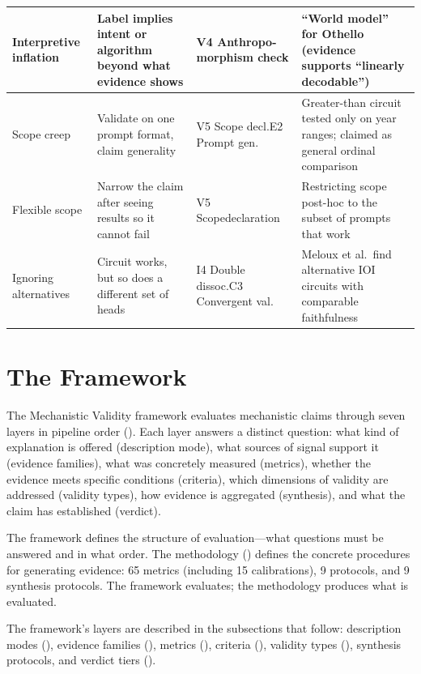 \documentclass{article}
\begin{document}
\begin{table}[H]
\begin{tabular}{@{}l>{\raggedright\arraybackslash}p{3.2cm}>{\raggedright\arraybackslash}p{2.8cm}>{\raggedright\arraybackslash}p{4.0cm}@{}}
\midrule
Interpretive inflation & Label implies intent or algorithm beyond what evidence shows & V4 Anthropo-\newline morphism check & ``World model'' for Othello (evidence supports ``linearly decodable'') \\
\midrule
Scope creep & Validate on one prompt format, claim generality & V5 Scope decl.\newline E2 Prompt gen. & Greater-than circuit tested only on year ranges; claimed as general ordinal comparison \\
\midrule
Flexible scope & Narrow the claim after seeing results so it cannot fail & V5 Scope\newline declaration & Restricting scope post-hoc to the subset of prompts that work \\
\midrule
Ignoring alternatives & Circuit works, but so does a different set of heads & I4 Double dissoc.\newline C3 Convergent val. & Meloux et al.\ find alternative IOI circuits with comparable faithfulness \\
\bottomrule
\end{tabular}
\end{table}
\endgroup


\section{The Framework}
\label{sec:framework}

The Mechanistic Validity framework evaluates mechanistic claims through seven layers in pipeline order (). Each layer answers a distinct question: what kind of explanation is offered (description mode), what sources of signal support it (evidence families), what was concretely measured (metrics), whether the evidence meets specific conditions (criteria), which dimensions of validity are addressed (validity types), how evidence is aggregated (synthesis), and what the claim has established (verdict). 

The framework defines the structure of evaluation---what questions must be answered and in what order. The methodology () defines the concrete procedures for generating evidence: 65 metrics (including 15 calibrations), 9 protocols, and 9 synthesis protocols. The framework evaluates; the methodology produces what is evaluated.

The framework's layers are described in the subsections that follow: description modes (), evidence families (), metrics (), criteria (), validity types (), synthesis protocols, and verdict tiers ().
\end{document}
